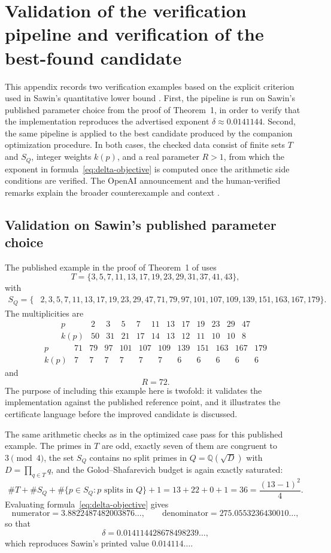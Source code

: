 \documentclass[a4paper,12pt]{article}
\begin{document}
\appendix
\section{Validation of the verification pipeline and verification of the best-found candidate}\label{app:verification}

This appendix records two verification examples based on the explicit criterion used in Sawin's quantitative lower bound \cite{Sawin2026}.  First, the pipeline is run on Sawin's published parameter choice from the proof of Theorem~1, in order to verify that the implementation reproduces the advertised exponent $\delta\approx 0.0141144$.  Second, the same pipeline is applied to the best candidate produced by the companion optimization procedure.  In both cases, the checked data consist of finite sets $T$ and $S_Q$, integer weights $k(p)$, and a real parameter $R>1$, from which the exponent in formula~\eqref{eq:delta-objective} is computed once the arithmetic side conditions are verified.  The OpenAI announcement and the human-verified remarks explain the broader counterexample and context \cite{OpenAI2026,AlonEtAl2026}.

\subsection*{Validation on Sawin's published parameter choice}

The published example in the proof of Theorem~1 of \cite{Sawin2026} uses
\[
T=\{3,5,7,11,13,17,19,23,29,31,37,41,43\},
\]
with
\[
\begin{split}
S_Q=\{&2,3,5,7,11,13,17,19,23,29,47,71,79,97,101,107,109,139,151,163,167,179\}.
\end{split}
\]
The multiplicities are
\[
\begin{array}{c|rrrrrrrrrrr}
p&2&3&5&7&11&13&17&19&23&29&47\\
\hline
k(p)&50&31&21&17&14&13&12&11&10&10&8
\end{array}
\]
\[
\begin{array}{c|rrrrrrrrrrr}
p&71&79&97&101&107&109&139&151&163&167&179\\
\hline
k(p)&7&7&7&7&7&7&6&6&6&6&6
\end{array}
\]
and
\[
R=72.
\]
The purpose of including this example here is twofold: it validates the implementation against the published reference point, and it illustrates the certificate language before the improved candidate is discussed.

The same arithmetic checks as in the optimized case pass for this published example.  The primes in $T$ are odd, exactly seven of them are congruent to $3\pmod 4$, the set $S_Q$ contains no split primes in $Q=\mathbb{Q}(\sqrt D)$ with $D=\prod_{q\in T}q$, and the Golod--Shafarevich budget is again exactly saturated:
\[
\#T+\#S_Q+\#\{p\in S_Q:p\text{ splits in }Q\}+1=13+22+0+1=36=\frac{(13-1)^2}{4}.
\]
Evaluating formula~\eqref{eq:delta-objective} gives
\[
\text{numerator}=3.8822487482003876\ldots,
\qquad
\text{denominator}=275.0553236430010\ldots,
\]
so that
\[
\delta=0.014114428678498239\ldots,
\]
which reproduces Sawin's printed value $0.014114\ldots$.
\end{document}
